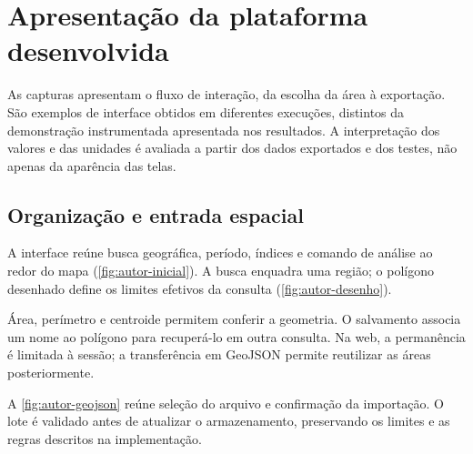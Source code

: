 \clearpage
\section{Apresentação da plataforma desenvolvida}\label{chap:plataforma-final}

As capturas apresentam o fluxo de interação, da escolha da área à exportação. São exemplos de interface obtidos em diferentes execuções, distintos da demonstração instrumentada apresentada nos resultados. A interpretação dos valores e das unidades é avaliada a partir dos dados exportados e dos testes, não apenas da aparência das telas.

\subsection{Organização e entrada espacial}

A interface reúne busca geográfica, período, índices e comando de análise ao redor do mapa (\cref{fig:autor-inicial}). A busca enquadra uma região; o polígono desenhado define os limites efetivos da consulta (\cref{fig:autor-desenho}).

Área, perímetro e centroide permitem conferir a geometria. O salvamento associa um nome ao polígono para recuperá-lo em outra consulta. Na web, a permanência é limitada à sessão; a transferência em GeoJSON permite reutilizar as áreas posteriormente.


A \cref{fig:autor-geojson} reúne seleção do arquivo e confirmação da importação. O lote é validado antes de atualizar o armazenamento, preservando os limites e as regras descritos na implementação.


